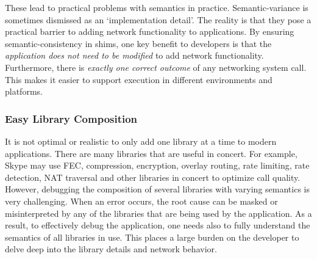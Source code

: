 


These lead to practical problems with semantics in practice.
Semantic-variance is sometimes dismissed as an `implementation detail'.
The reality is that they pose a practical barrier to adding network 
functionality to applications.   By ensuring semantic-consistency in shims, one key benefit to developers is that the {\it application does not need to be modified} to add network functionality.  Furthermore, there is {\it exactly one correct outcome} of any networking system call.  This makes it easier to support execution in different environments and platforms.

\subsubsection{Easy Library Composition} 
It is not optimal or realistic to only add one library at a time to modern applications.   There are many libraries that are useful in concert.  For example, Skype may use FEC, compression, encryption, overlay routing, rate limiting, rate detection, NAT traversal and other libraries in concert to optimize call quality.  However, debugging the composition of several libraries with varying semantics is very challenging.   When an error occurs, the root cause can be masked or misinterpreted by any of the libraries that are being used by the application.   As a result, to effectively debug the application, one needs also to fully understand the semantics of all libraries in use.   This places a large burden on the developer to delve deep into the library details and network behavior.


